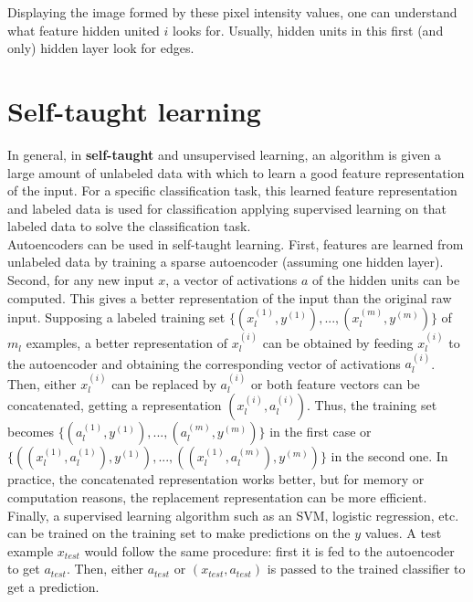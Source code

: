 \documentclass{report}
\begin{document}
Displaying the image formed by these pixel intensity values, one can understand what feature hidden united $i$ looks for. Usually, hidden units in this first (and only) hidden layer look for edges.

\section{Self-taught learning}
In general, in {\bf self-taught} and unsupervised learning, an algorithm is given a large amount of unlabeled data with which to learn a good feature representation of the input.
For a specific classification task, this learned feature representation and labeled data is used for classification applying supervised learning on that labeled data to solve the classification task.
\\
Autoencoders can be used in self-taught learning.
First, features are learned from unlabeled data by training a sparse autoencoder (assuming one hidden layer).
\\
Second, for any new input $x$, a vector of activations $a$ of the hidden units can be computed.
This gives a better representation of the input than the original raw input.
Supposing a labeled training set $\{(x_l^{(1)}, y^{(1)}), ..., (x_l^{(m)}, y^{(m)})\}$ of $m_l$ examples, a better representation of $x_l^{(i)}$ can be obtained by feeding $x_l^{(i)}$ to the autoencoder and obtaining the corresponding vector of activations $a_l^{(i)}$.
Then, either $x_l^{(i)}$ can be replaced by $a_l^{(i)}$ or both feature vectors can be concatenated, getting a representation $(x_l^{(i)}, a_l^{(i)})$.
Thus, the training set becomes $\{(a_l^{(1)}, y^{(1)}), ..., (a_l^{(m)}, y^{(m)})\}$ in the first case or $\{((x_l^{(1)}, a_l^{(1)}), y^{(1)}), ..., ((x_l^{(1)}, a_l^{(m)}), y^{(m)})\}$ in the second one.
In practice, the concatenated representation works better, but for memory or computation reasons, the replacement representation can be more efficient.
\\
Finally, a supervised learning algorithm such as an SVM, logistic regression, etc. can be trained on the training set to make predictions on the $y$ values.
A test example $x_{test}$ would follow the same procedure: first it is fed to the autoencoder to get $a_{test}$.
Then, either $a_{test}$ or $(x_{test}, a_{test})$ is passed to the trained classifier to get a prediction.
\end{document}
